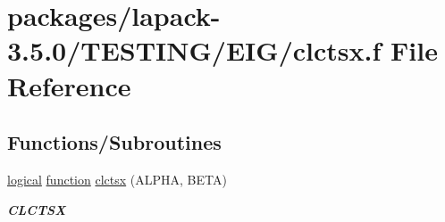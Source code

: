 \hypertarget{clctsx_8f}{}\section{packages/lapack-\/3.5.0/\+T\+E\+S\+T\+I\+N\+G/\+E\+I\+G/clctsx.f File Reference}
\label{clctsx_8f}
\subsection*{Functions/\+Subroutines}
\begin{DoxyCompactItemize}
\item 
\hyperlink{tnc_8c_aa7b64cdf39500931f7b333343791a104}{logical} \hyperlink{afunc_8m_a7b5e596df91eadea6c537c0825e894a7}{function} \hyperlink{group__complex__eig_gaf2475404f498a9fc9f7146da5a6829ad}{clctsx} (A\+L\+P\+H\+A, B\+E\+T\+A)
\begin{DoxyCompactList}\small\item\em {\bfseries C\+L\+C\+T\+S\+X} \end{DoxyCompactList}\end{DoxyCompactItemize}
